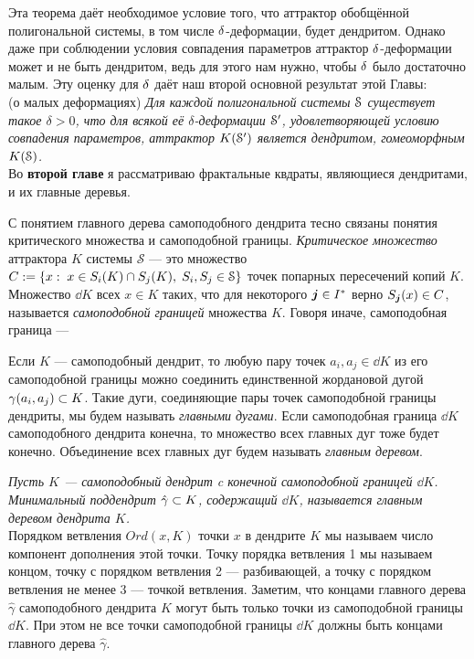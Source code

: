 Эта теорема даёт необходимое условие того, что аттрактор обобщённой полигональной системы, в том числе $\delta$-деформации, будет дендритом. 
Однако даже при соблюдении условия совпадения параметров аттрактор $\delta$-деформации может и не быть дендритом, ведь для этого нам нужно, чтобы $\delta$ было достаточно малым. 
Эту оценку для $\delta$ даёт наш второй основной результат этой Главы:\\

 (о малых деформациях)
{\em Для каждой полигональной системы ${\EuScript S}$ существует такое $\delta > 0$, что для всякой её $\delta$-деформации ${\EuScript S}'$, удовлетворяющей условию совпадения параметров, аттрактор $K({\EuScript S}')$ является дендритом, гомеоморфным $K({\EuScript S})$.}\\


Во {\bf второй главе} я рассматриваю фрактальные квдраты, являющиеся дендритами, и их главные деревья.

С понятием главного дерева самоподобного дендрита тесно связаны понятия критического множества и самоподобной границы.
{\em Критическое множество} аттрактора $K$ системы $\mathcal{S}$ --- это множество $C:=\{x:\; x\in S_i(K)\cap S_j(K),\; S_i, S_j\in{\EuScript S}\}$ точек попарных пересечений копий $K$. 
Множество $\dd K$ всех $x\in K$ таких, что для некоторого ${\bm{j}}\in I^*$ верно $S_{\bm{j}}(x)\in C$, называется {\em самоподобной границей} множества $K$.
Говоря иначе, самоподобная граница ---

Если $K$ --- самоподобный дендрит, то любую пару точек $a_i,a_j\in\dd K$ из его самоподобной границы можно соединить единственной жордановой дугой $\gamma(a_i,a_j)\subset K$.
Такие дуги, соединяющие пары точек самоподобной границы дендриты, мы будем называть {\em главными дугами}.
Если самоподобная граница $\dd K$ самоподобного дендрита конечна, то множество всех главных дуг тоже будет конечно.
Объединение всех главных дуг будем называть {\em главным деревом}.

{\em Пусть $K$ --- самоподобный дендрит c конечной самоподобной границей $\dd K$. 
Минимальный поддендрит $\hat\gamma\subset K$, содержащий $\dd K$, называется {\em главным деревом} дендрита $K$.}\\

Порядком ветвления $Ord(x,K)$ точки $x$ в дендрите $K$ мы называем число компонент дополнения этой точки.
Точку порядка ветвления 1 мы называем концом, точку с порядком ветвления 2 --- разбивающей, а точку с порядком ветвления не менее 3 --- точкой ветвления.
Заметим, что концами главного дерева $\hat\gamma$ самоподобного дендрита $K$ могут быть только точки из самоподобной границы $\dd K$.
При этом не все точки самоподобной границы $\dd K$ должны быть концами главного дерева $\hat\gamma$.

